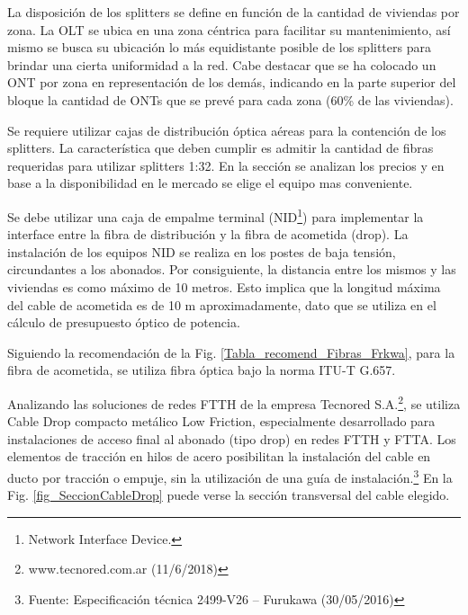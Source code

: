 \documentclass[12pt,a4paper]{book}
\begin{document}
La disposición de los splitters se define en función de la cantidad de
viviendas por zona. La OLT se ubica en una zona céntrica para facilitar su
mantenimiento, así mismo se busca su ubicación lo más equidistante
posible de los splitters para brindar una cierta uniformidad a la red. Cabe
destacar que se ha colocado un ONT por zona en representación de los
demás, indicando en la parte superior del bloque la cantidad de ONTs que
se prevé para cada zona (60\% de las viviendas).

\medskip

Se requiere utilizar cajas de distribución óptica aéreas para la contención de los splitters. La característica que deben cumplir es admitir la cantidad de fibras requeridas para utilizar splitters 1:32. En la sección \label{Colocar_sec_costo_red} se analizan los precios y en base a la disponibilidad en le mercado se elige el equipo mas conveniente.

\medskip

Se debe utilizar una caja de empalme terminal (NID\footnote{Network Interface Device.}) para implementar la
interface entre la fibra de distribución y la fibra de acometida (drop). 
La instalación de los equipos NID se realiza en los
postes de baja tensión, circundantes a los abonados. Por consiguiente, la
distancia entre los mismos y las viviendas es como máximo de 10 metros.
Esto implica que la longitud máxima del cable de acometida es de 10 m
aproximadamente, dato que se utiliza en el cálculo de presupuesto óptico
de potencia.

\medskip

Siguiendo la recomendación de la Fig. \ref{Tabla_recomend_Fibras_Frkwa}, para la fibra de acometida, se utiliza fibra óptica bajo la norma ITU-T G.657.

\medskip

Analizando las soluciones de redes FTTH de la empresa Tecnored S.A.\footnote{www.tecnored.com.ar (11/6/2018)},
se utiliza Cable Drop compacto metálico Low Friction, especialmente
desarrollado para instalaciones de acceso final al abonado (tipo drop) en
redes FTTH y FTTA. Los elementos de tracción en hilos de acero posibilitan
la instalación del cable en ducto por tracción o empuje, sin la utilización de
una guía de instalación.\footnote{Fuente: Especificación técnica 2499-V26 – Furukawa (30/05/2016)} En la Fig. \ref{fig_SeccionCableDrop} puede verse la sección transversal del cable elegido.

\medskip
\end{document}
